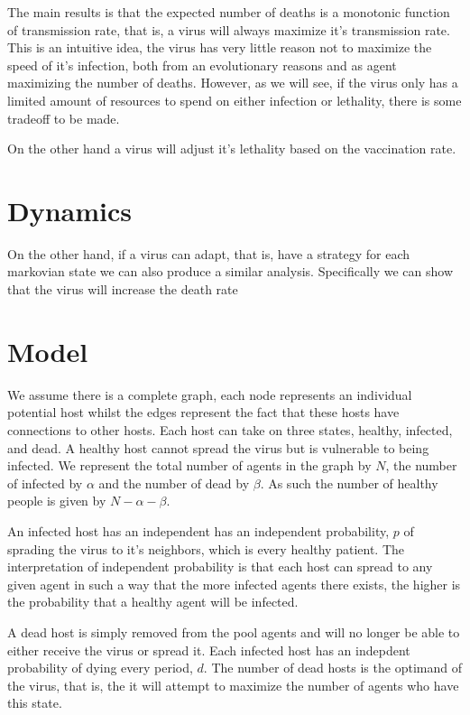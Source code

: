 \documentclass[12pt]{report}
\numberwithin{equation}{section}
\begin{document}
The main results is that the expected number of deaths is a monotonic function of transmission rate, that is, a virus will always maximize it's transmission rate. This is an intuitive idea, the virus has very little reason not to maximize the speed of it's infection, both from an evolutionary reasons and as agent maximizing the number of deaths. However, as we will see, if the virus only has a limited amount of resources to spend on either infection or lethality, there is some tradeoff to be made. 

On the other hand a virus will adjust it's lethality based on the vaccination rate. 


\section{Dynamics}

On the other hand, if a virus can adapt, that is, have a strategy for each markovian state we can also produce a similar analysis. Specifically we can show that the virus will increase the death rate 

\section{Model}

We assume there is a complete graph, each node represents an individual potential host whilst the edges represent the fact that these hosts have connections to other hosts. Each host can take on three states, healthy, infected, and dead. A healthy host cannot spread the virus but is vulnerable to being infected. We represent the total number of agents in the graph by $N$, the number of infected by $\alpha$ and the number of dead by $\beta$. As such the number of healthy people is given by $N-\alpha-\beta$. 

An infected host has an independent has an independent probability, $p$ of sprading the virus to it's neighbors, which is every healthy patient. The interpretation of independent probability is that each host can spread to any given agent in such a way that the more infected agents there exists, the higher is the probability that a healthy agent will be infected. 

A dead host is simply removed from the pool agents and will no longer be able to either receive the virus or spread it. Each infected host has an indepdent probability of dying every period, $d$. The number of dead hosts is the optimand of the virus, that is, the it will attempt to maximize the number of agents who have this state. 
\end{document}
